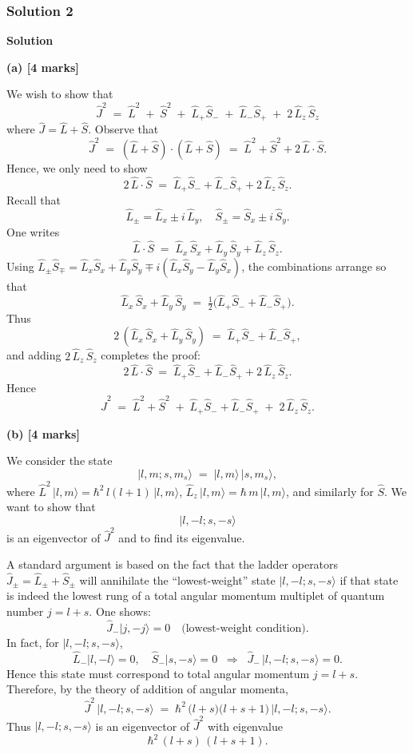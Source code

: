 \documentclass{article}
\begin{document}
\subsubsection{Solution 2}

\textbf{Solution}

\bigskip

\textbf{(a) [4 marks]}

We wish to show that
\[
\hat{J}^2 \;=\; \hat{L}^2 \;+\; \hat{S}^2 \;+\;\hat{L}_+\hat{S}_- \;+\;\hat{L}_-\hat{S}_+ \;+\;2\,\hat{L}_z\,\hat{S}_z
\]
where \(\hat{J} = \hat{L} + \hat{S}\). Observe that
\[
\hat{J}^2 \;=\; (\hat{L} + \hat{S}) \cdot (\hat{L} + \hat{S}) 
\;=\; \hat{L}^2 + \hat{S}^2 + 2\,\hat{L}\cdot \hat{S}.
\]
Hence, we only need to show
\[
2\,\hat{L}\cdot \hat{S} 
\;=\;
\hat{L}_+\hat{S}_- + \hat{L}_-\hat{S}_+ + 2\,\hat{L}_z\,\hat{S}_z.
\]
Recall that
\[
\hat{L}_\pm = \hat{L}_x \pm i\,\hat{L}_y,
\quad
\hat{S}_\pm = \hat{S}_x \pm i\,\hat{S}_y.
\]
One writes
\[
\hat{L}\cdot \hat{S} 
\;=\; 
\hat{L}_x\,\hat{S}_x + \hat{L}_y\,\hat{S}_y + \hat{L}_z\,\hat{S}_z.
\]
Using \(\hat{L}_\pm\hat{S}_\mp = \hat{L}_x \hat{S}_x + \hat{L}_y \hat{S}_y \mp i(\hat{L}_x \hat{S}_y - \hat{L}_y \hat{S}_x)\), the combinations arrange so that
\[
\hat{L}_x\,\hat{S}_x + \hat{L}_y\,\hat{S}_y
\;=\;
\tfrac{1}{2}\bigl(\hat{L}_+\hat{S}_- + \hat{L}_-\hat{S}_+\bigr).
\]
Thus
\[
2\,(\hat{L}_x\,\hat{S}_x + \hat{L}_y\,\hat{S}_y) 
\;=\; 
\hat{L}_+\hat{S}_- + \hat{L}_-\hat{S}_+,
\]
and adding \(2\,\hat{L}_z\,\hat{S}_z\) completes the proof:
\[
2\,\hat{L}\cdot \hat{S}
\;=\;
\hat{L}_+\hat{S}_- + \hat{L}_-\hat{S}_+ + 2\,\hat{L}_z\,\hat{S}_z.
\]
Hence
\[
\hat{J}^2 \;=\; \hat{L}^2 + \hat{S}^2 
\;+\; \hat{L}_+\hat{S}_- + \hat{L}_-\hat{S}_+ \;+\; 2\,\hat{L}_z\,\hat{S}_z.
\]

\bigskip

\textbf{(b) [4 marks]}

We consider the state
\[
\lvert l, m; s, m_s\rangle 
\;=\; \lvert l, m\rangle \,\lvert s, m_s\rangle,
\]
where \(\hat{L}^2\,\lvert l,m\rangle = \hbar^2\,l(l+1)\,\lvert l,m\rangle\), \(\hat{L}_z\,\lvert l,m\rangle = \hbar\,m\,\lvert l,m\rangle\), and similarly for \(\hat{S}\). We want to show that
\[
\lvert l, -l; s, -s\rangle
\]
is an eigenvector of \(\hat{J}^2\) and to find its eigenvalue. 

A standard argument is based on the fact that the ladder operators \(\hat{J}_\pm = \hat{L}_\pm + \hat{S}_\pm\) will annihilate the ``lowest-weight'' state \(\lvert l, -l; s, -s\rangle\) if that state is indeed the lowest rung of a total angular momentum multiplet of quantum number \(j = l + s\). One shows:
\[
\hat{J}_-\lvert j, -j\rangle = 0 
\quad\text{(lowest-weight condition).}
\]
In fact, for \(\lvert l, -l; s, -s\rangle\),
\[
\hat{L}_-\lvert l, -l\rangle = 0,
\quad
\hat{S}_-\lvert s, -s\rangle = 0 
\;\;\Rightarrow\;\;
\hat{J}_-\,\lvert l, -l; s, -s\rangle = 0.
\]
Hence this state must correspond to total angular momentum \(j=l+s\). Therefore, by the theory of addition of angular momenta,
\[
\hat{J}^2\,\lvert l, -l; s, -s\rangle 
\;=\; \hbar^2\,\bigl(l + s\bigr)\bigl(l + s + 1\bigr)\,\lvert l, -l; s, -s\rangle.
\]
Thus \(\lvert l, -l; s, -s\rangle\) is an eigenvector of \(\hat{J}^2\) with eigenvalue 
\[
\hbar^2\,(l + s)\,(l + s + 1).
\]
\end{document}

